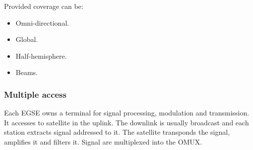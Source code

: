 \documentclass[../main.tex]{subfiles}
\begin{document}
Provided coverage can be:
\begin{itemize}
	\item Omni-directional.
	\item Global.
	\item Half-hemisphere.
	\item Beams.
\end{itemize}

\subsubsection{Multiple access}

Each EGSE owns a terminal for signal processing, modulation and transmission. It accesses to satellite in the uplink. The downlink is usually broadcast and each station extracts signal addressed to it. The satellite transponds the signal, amplifies it and filters it. Signal are multiplexed into the OMUX.
\end{document}
